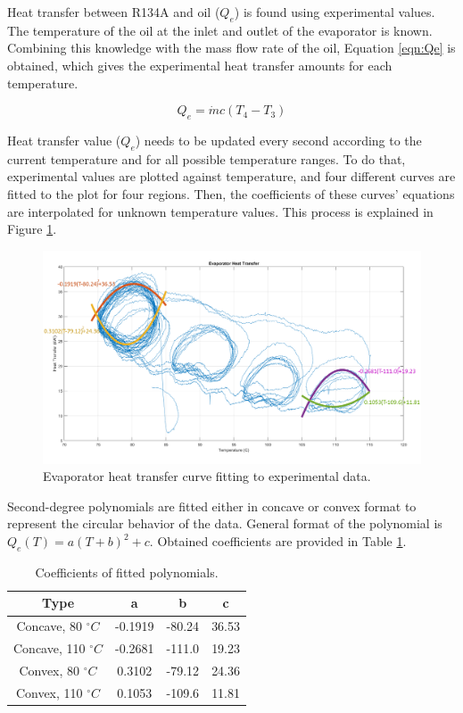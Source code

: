 \par
Heat transfer between R134A and oil ($Q_{e}$) is found using experimental values. The temperature of the oil at the inlet and outlet of the evaporator is known. Combining this knowledge with the mass flow rate of the oil, Equation \ref{eqn:Qe} is obtained, which gives the experimental heat transfer amounts for each temperature.

\begin{equation}
    \label{eqn:Qe}
    Q_{e} = \dot{m}c(T_{4} - T_{3})
\end{equation}

Heat transfer value ($Q_{e}$) needs to be updated every second according to the current temperature and for all possible temperature ranges. To do that, experimental values are plotted against temperature, and four different curves are fitted to the plot for four regions. Then, the coefficients of these curves' equations are interpolated for unknown temperature values. This process is explained in Figure \ref{fig:curvefit}.

\begin{figure}[h]
    \centering
    \includegraphics[width=16cm]{images/evaporator_fit.png}
    \caption{Evaporator heat transfer curve fitting to experimental data.}
    \label{fig:curvefit}
\end{figure}

Second-degree polynomials are fitted either in concave or convex format to represent the circular behavior of the data. General format of the polynomial is $Q_{e}(T) = a(T+b)^2+c$. Obtained coefficients are provided in Table \ref{tab:polyfit}.

\begin{table}[h]
    \centering
    \begin{tabular}{|c|c|c|c|}
        \hline
        Type                    & a & b & c \\
        \hline
        Concave, 80 $^\circ C$   & -0.1919 & -80.24 & 36.53 \\
        Concave, 110 $^\circ C$  & -0.2681 & -111.0 & 19.23 \\
        Convex, 80 $^\circ C$   & 0.3102  & -79.12 & 24.36 \\
        Convex, 110 $^\circ C$  & 0.1053  & -109.6 & 11.81 \\
        \hline
    \end{tabular}
    \caption{Coefficients of fitted polynomials.}
    \label{tab:polyfit}
\end{table}

